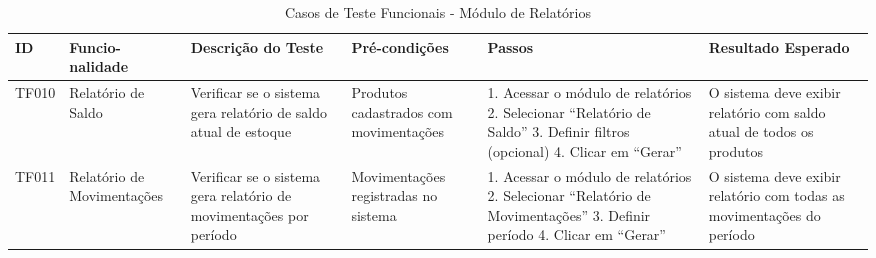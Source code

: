 \documentclass[
	12pt,				%
	openany,			%
	twoside,			%
	a4paper,			%
	english,			%
	brazil				%
	]{abntex2}
\begin{document}
\begin{table}[htbp]

\caption{Casos de Teste Funcionais - Módulo de Relatórios}
\begin{tabular}{|p{1cm}|p{1.5cm}|p{3.2cm}|p{2.1cm}|p{3.5cm}|p{3.5cm}|}
\hline
\textbf{ID} & \textbf{Funcio-nalidade} & \textbf{Descrição do Teste} & \textbf{Pré-condições} & \textbf{Passos} & \textbf{Resultado Esperado} \\
\hline
TF010 & Relatório de Saldo & Verificar se o sistema gera relatório de saldo atual de estoque & Produtos cadastrados com movimentações & 
1. Acessar o módulo de relatórios
2. Selecionar ``Relatório de Saldo''
3. Definir filtros (opcional)
4. Clicar em ``Gerar'' & 
O sistema deve exibir relatório com saldo atual de todos os produtos \\
\hline
TF011 & Relatório de Movimentações & Verificar se o sistema gera relatório de movimentações por período & Movimentações registradas no sistema & 
1. Acessar o módulo de relatórios
2. Selecionar ``Relatório de Movimentações''
3. Definir período
4. Clicar em ``Gerar'' & 
O sistema deve exibir relatório com todas as movimentações do período \\
\hline
\end{tabular}
\end{table}

\FloatBarrier
\end{document}
